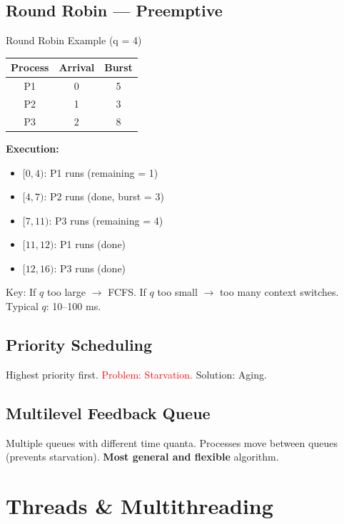 \documentclass[12pt,a4paper]{article}
\begin{document}
\subsection{Round Robin --- Preemptive}

\begin{examplebox}{Round Robin Example (q = 4)}
\begin{center}
\begin{tabular}{@{} c c c @{}}
\toprule
\textbf{Process} & \textbf{Arrival} & \textbf{Burst} \\
\midrule
P1 & 0 & 5 \\
P2 & 1 & 3 \\
P3 & 2 & 8 \\
\bottomrule
\end{tabular}
\end{center}

\textbf{Execution:}
\begin{itemize}[leftmargin=*]
    \item $[0, 4)$: P1 runs (remaining = 1)
    \item $[4, 7)$: P2 runs (done, burst = 3)
    \item $[7, 11)$: P3 runs (remaining = 4)
    \item $[11, 12)$: P1 runs (done)
    \item $[12, 16)$: P3 runs (done)
\end{itemize}

Key: If $q$ too large $\rightarrow$ FCFS. If $q$ too small $\rightarrow$ too many context switches. Typical $q$: 10--100 ms.
\end{examplebox}

\subsection{Priority Scheduling}
Highest priority first. \textcolor{red}{Problem: Starvation.} \textcolor{accentgreen}{Solution: Aging.}

\subsection{Multilevel Feedback Queue}
Multiple queues with different time quanta. Processes move between queues (prevents starvation). \textbf{Most general and flexible} algorithm.

\section{Threads \& Multithreading}
\end{document}
